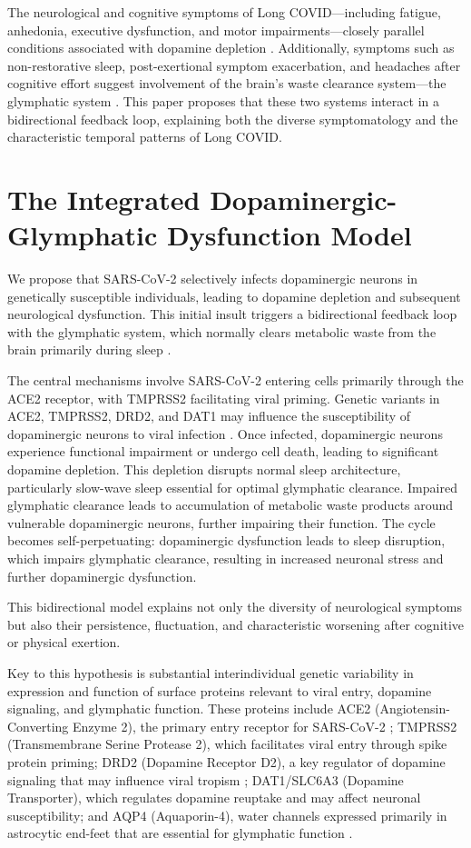 \documentclass[12pt]{article}
\begin{document}
The neurological and cognitive symptoms of Long COVID—including fatigue, anhedonia, executive dysfunction, and motor impairments—closely parallel conditions associated with dopamine depletion \citep{Brundin2020, Cappelletti2023}. Additionally, symptoms such as non-restorative sleep, post-exertional symptom exacerbation, and headaches after cognitive effort suggest involvement of the brain's waste clearance system—the glymphatic system \citep{Nedergaard2013, Piantino2019}. This paper proposes that these two systems interact in a bidirectional feedback loop, explaining both the diverse symptomatology and the characteristic temporal patterns of Long COVID.

\section{The Integrated Dopaminergic-Glymphatic Dysfunction Model}

We propose that SARS-CoV-2 selectively infects dopaminergic neurons in genetically susceptible individuals, leading to dopamine depletion and subsequent neurological dysfunction. This initial insult triggers a bidirectional feedback loop with the glymphatic system, which normally clears metabolic waste from the brain primarily during sleep \citep{Xie2013}. 

The central mechanisms involve SARS-CoV-2 entering cells primarily through the ACE2 receptor, with TMPRSS2 facilitating viral priming. Genetic variants in ACE2, TMPRSS2, DRD2, and DAT1 may influence the susceptibility of dopaminergic neurons to viral infection \citep{Novelli2020, Asselta2020}. Once infected, dopaminergic neurons experience functional impairment or undergo cell death, leading to significant dopamine depletion. This depletion disrupts normal sleep architecture, particularly slow-wave sleep essential for optimal glymphatic clearance. Impaired glymphatic clearance leads to accumulation of metabolic waste products around vulnerable dopaminergic neurons, further impairing their function. The cycle becomes self-perpetuating: dopaminergic dysfunction leads to sleep disruption, which impairs glymphatic clearance, resulting in increased neuronal stress and further dopaminergic dysfunction.

This bidirectional model explains not only the diversity of neurological symptoms but also their persistence, fluctuation, and characteristic worsening after cognitive or physical exertion.

Key to this hypothesis is substantial interindividual genetic variability in expression and function of surface proteins relevant to viral entry, dopamine signaling, and glymphatic function. These proteins include ACE2 (Angiotensin-Converting Enzyme 2), the primary entry receptor for SARS-CoV-2 \citep{Cao2020}; TMPRSS2 (Transmembrane Serine Protease 2), which facilitates viral entry through spike protein priming; DRD2 (Dopamine Receptor D2), a key regulator of dopamine signaling that may influence viral tropism \citep{Eisenstein2016}; DAT1/SLC6A3 (Dopamine Transporter), which regulates dopamine reuptake and may affect neuronal susceptibility; and AQP4 (Aquaporin-4), water channels expressed primarily in astrocytic end-feet that are essential for glymphatic function \citep{Mestre2018}.
\end{document}

